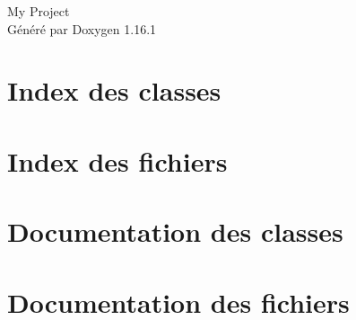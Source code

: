 \documentclass[twoside]{book}
\newcommand{\+}{\discretionary{\mbox{\scriptsize$\hookleftarrow$}}{}{}}
\newcommand{\clearemptydoublepage}{%
    \newpage{\pagestyle{empty}\cleardoublepage}%
  }
\begin{document}
  \raggedbottom
    \hypersetup{pageanchor=false,
                bookmarksnumbered=true,
                pdfencoding=unicode
               }
  \begin{titlepage}
  \vspace*{7cm}
  \begin{center}%
  {\Large My Project}\\
  \vspace*{1cm}
  {\large Généré par Doxygen 1.16.1}\\
  \end{center}
  \end{titlepage}
  \clearemptydoublepage
  \tableofcontents
  \clearemptydoublepage
  \hypersetup{pageanchor=true}
\chapter{Index des classes}

\chapter{Index des fichiers}

\chapter{Documentation des classes}




\chapter{Documentation des fichiers}




  \backmatter
  \newpage
  \clearemptydoublepage
  \printindex
\end{document}
